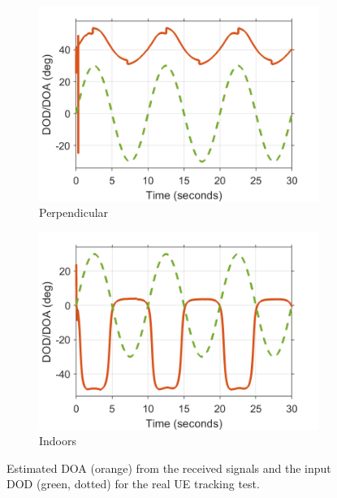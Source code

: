 \documentclass[12pt,a4paper]{report}
\begin{document}
\begin{figure}[h]
    \begin{subfigure}{0.45\textwidth}
        \centering
        \includegraphics[width = \textwidth]{Figures/test_doa_par.png}
        \caption{Perpendicular}
        \label{fig:test:ue:doa:perp}
    \end{subfigure}
    \hfill
    \begin{subfigure}{0.45\textwidth}
        \centering
        \includegraphics[width = \textwidth]{Figures/test_doa_ind.png}
        \caption{Indoors}
        \label{fig:test:ue:doa:ind}
    \end{subfigure}
    \caption[DOA measurements for the UE tracking tests.]{Estimated DOA (orange) from the received signals and the input DOD (green, dotted) for the real UE tracking test.}
    \label{fig:test:ue:doa}
\end{figure}
\end{document}
